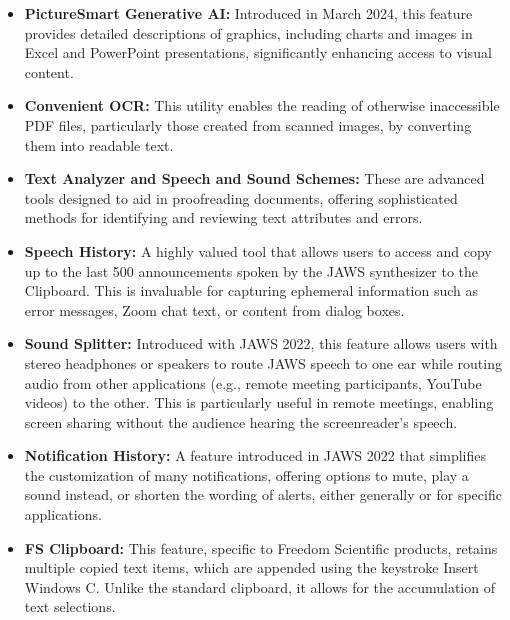 \begin{itemize}
	\item \textbf{PictureSmart Generative AI:} Introduced in March 2024, this feature provides detailed descriptions of graphics, including charts and images in Excel and PowerPoint presentations, significantly enhancing access to visual content.\supercite{kingsbury2025}
	\item \textbf{Convenient OCR:} This utility enables the reading of otherwise inaccessible PDF files, particularly those created from scanned images, by converting them into readable text.\supercite{kingsbury2025}
	\item \textbf{Text Analyzer and Speech and Sound Schemes:} These are advanced tools designed to aid in proofreading documents, offering sophisticated methods for identifying and reviewing text attributes and errors.\supercite{kingsbury2025}
	\item \textbf{Speech History:} A highly valued tool that allows users to access and copy up to the last 500 announcements spoken by the JAWS synthesizer to the Clipboard. This is invaluable for capturing ephemeral information such as error messages, Zoom chat text, or content from dialog boxes.\supercite{kingsbury2025}
	\item \textbf{Sound Splitter:} Introduced with JAWS 2022, this feature allows users with stereo headphones or speakers to route JAWS speech to one ear while routing audio from other applications (e.g., remote meeting participants, YouTube videos) to the other. This is particularly useful in remote meetings, enabling screen sharing without the audience hearing the screenreader's speech.\supercite{kingsbury2025}
	\item \textbf{Notification History:} A feature introduced in JAWS 2022 that simplifies the customization of many notifications, offering options to mute, play a sound instead, or shorten the wording of alerts, either generally or for specific applications.\supercite{kingsbury2025}
	\item \textbf{FS Clipboard:} This feature, specific to Freedom Scientific products, retains multiple copied text items, which are appended using the keystroke Insert Windows C. Unlike the standard clipboard, it allows for the accumulation of text selections.\supercite{kingsbury2025}
\end{itemize}
